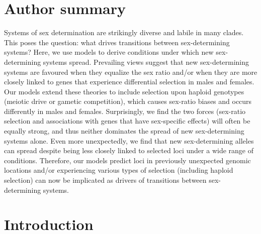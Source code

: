 \documentclass[10pt,letterpaper]{article}
\begin{document}
\section*{Author summary}
Systems of sex determination are strikingly diverse and labile in many clades. 
This poses the question: what drives transitions between sex-determining systems? 
Here, we use models to derive conditions under which new sex-determining systems spread. 
Prevailing views suggest that new sex-determining systems are favoured when they equalize the sex ratio and/or when they are more closely linked to genes that experience differential selection in males and females. 
Our models extend these theories to include selection upon haploid genotypes (meiotic drive or gametic competition), which causes sex-ratio biases and occurs differently in males and females. 
Surprisingly, we find the two forces (sex-ratio selection and associations with genes that have sex-specific effects) will often be equally strong, and thus neither dominates the spread of new sex-determining systems alone. 
Even more unexpectedly, we find that new sex-determining alleles can spread despite being less closely linked to selected loci under a wide range of conditions. 
Therefore, our models predict loci in previously unexpected genomic locations and/or experiencing various types of selection (including haploid selection) can now be implicated as drivers of transitions between sex-determining systems. 

\linenumbers

\section*{Introduction}
\end{document}
